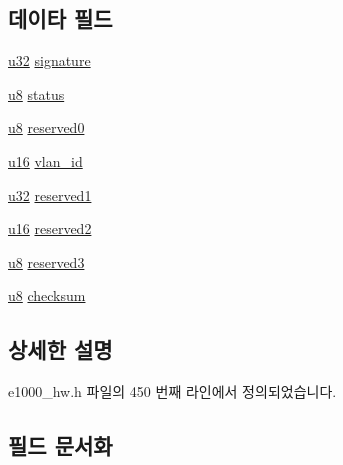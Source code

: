 \subsection*{데이타 필드}
\begin{DoxyCompactItemize}
\item 
\hyperlink{lib_2igb_2e1000__osdep_8h_a64e91c10a0d8fb627e92932050284264}{u32} \hyperlink{structe1000__host__mng__dhcp__cookie_aef0cc690e5b3aa5d638ae6da7d039528}{signature}
\item 
\hyperlink{lib_2igb_2e1000__osdep_8h_a8baca7e76da9e0e11ce3a275dd19130c}{u8} \hyperlink{structe1000__host__mng__dhcp__cookie_aa648386576736be0dd25c95b6edd37d2}{status}
\item 
\hyperlink{lib_2igb_2e1000__osdep_8h_a8baca7e76da9e0e11ce3a275dd19130c}{u8} \hyperlink{structe1000__host__mng__dhcp__cookie_a9ca2a9c78f44020325c0766d88e86a4f}{reserved0}
\item 
\hyperlink{lib_2igb_2e1000__osdep_8h_acdc9cf0314be0ae5a01d6d4379a95edd}{u16} \hyperlink{structe1000__host__mng__dhcp__cookie_a4d0bbf63fb5b0662f44a2ccfa1f3d6fe}{vlan\+\_\+id}
\item 
\hyperlink{lib_2igb_2e1000__osdep_8h_a64e91c10a0d8fb627e92932050284264}{u32} \hyperlink{structe1000__host__mng__dhcp__cookie_a3bfac4a72761ec71f969cf4db1557498}{reserved1}
\item 
\hyperlink{lib_2igb_2e1000__osdep_8h_acdc9cf0314be0ae5a01d6d4379a95edd}{u16} \hyperlink{structe1000__host__mng__dhcp__cookie_abb0880e72f68cfaf6a809f9e12d88e61}{reserved2}
\item 
\hyperlink{lib_2igb_2e1000__osdep_8h_a8baca7e76da9e0e11ce3a275dd19130c}{u8} \hyperlink{structe1000__host__mng__dhcp__cookie_aa1b2e3fc52f419b76e3d2b7b864f30e8}{reserved3}
\item 
\hyperlink{lib_2igb_2e1000__osdep_8h_a8baca7e76da9e0e11ce3a275dd19130c}{u8} \hyperlink{structe1000__host__mng__dhcp__cookie_afd93107fee98407f162be1294fb053fd}{checksum}
\end{DoxyCompactItemize}


\subsection{상세한 설명}


e1000\+\_\+hw.\+h 파일의 450 번째 라인에서 정의되었습니다.



\subsection{필드 문서화}
